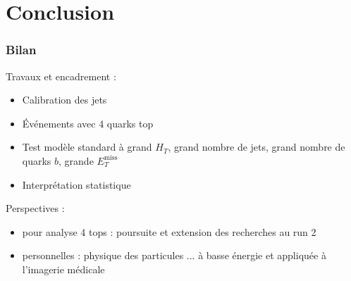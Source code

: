 \section[]{Conclusion}

\begin{frame}
\frametitle{Bilan}

\begin{maliste}
\item Travaux et encadrement :
\begin{itemize}
\item Calibration des jets
\vspace*{0.1cm}
\item \'Ev\'enements avec 4 quarks top
\vspace*{0.1cm}
\item Test mod\`ele standard \`a grand $H_T$, grand nombre de jets, grand nombre de quarks $b$, grande $E_T^\text{miss}$
\vspace*{0.1cm}
\item Interpr\'etation statistique
\end{itemize}
\vspace*{0.3cm}
\pause
\item Perspectives :
\begin{itemize}
\item pour analyse 4 tops : poursuite et extension des recherches au run 2
\vspace*{0.1cm}
\item personnelles : physique des particules ... \`a basse \'energie et appliqu\'ee \`a l'imagerie m\'edicale
\end{itemize}

\end{maliste}
\end{frame}






